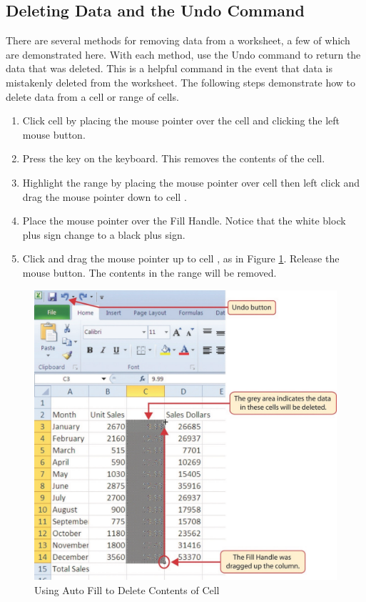 \subsection{Deleting Data and the Undo Command}

There are several methods for removing data from a worksheet, a few of which are demonstrated here. With each method, use the Undo command to return the data that was deleted. This is a helpful command in the event that data is mistakenly deleted from the worksheet. The following steps demonstrate how to delete data from a cell or range of cells.

\begin{enumerate}
	\item Click cell  by placing the mouse pointer over the cell and clicking the left mouse button.
	\item Press the  key on the keyboard. This removes the contents of the cell.
	\item Highlight the range  by placing the mouse pointer over cell  then left click and drag the mouse pointer down to cell .
	\item Place the mouse pointer over the Fill Handle. Notice that the white block plus sign change to a black plus sign.
	\item Click and drag the mouse pointer up to cell , as in Figure \ref{01:fig21}. Release the mouse button. The contents in the range  will be removed.
\end{enumerate}

\begin{figure}[H]
	\centering
	\includegraphics[width=\maxwidth{.95\linewidth}]{gfx/ch01_fig21}
	\caption{Using Auto Fill to Delete Contents of Cell}
	\label{01:fig21}
\end{figure}

